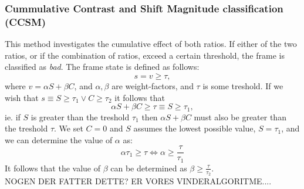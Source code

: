 \subsubsection{Cummulative Contrast and Shift Magnitude classification (CCSM)}
This method investigates the cumulative effect of both ratios. If either of the two ratios, or if the combination of ratios, exceed a certain threshold, the frame is classified as \textit{bad}. The frame state is defined as follows:\\
\[
s = v \ge \tau,
\]
where 
$v = \alpha S + \beta C$, and $\alpha,\beta$ are weight-factors, and %
$\tau$ is some treshold. If we wish that $s \equiv S \ge \tau_{1} \vee C \ge \tau_{2}$ it follows that
%
\[
 \alpha S + \beta C \ge \tau \equiv  S \ge \tau_{1},
\]
%
ie. if $S$ is greater than the treshold $\tau_{1}$ then $\alpha S + \beta C$ must also be greater than the treshold $\tau$.%
 We set $C = 0$ and $S$ assumes the lowest possible value, $S = \tau_{1}$, and we can determine the value of $\alpha$ as:
%
\[
\alpha \tau_{1} \ge \tau \Leftrightarrow \alpha \ge \frac{\tau}{\tau_{1}}
\]
%
It follows that the value of $\beta$ can be determined as $\beta \ge \frac{\tau}{\tau_{2}}$.
\\NOGEN DER FATTER DETTE? ER VORES VINDERALGORITME....
%
%
%
